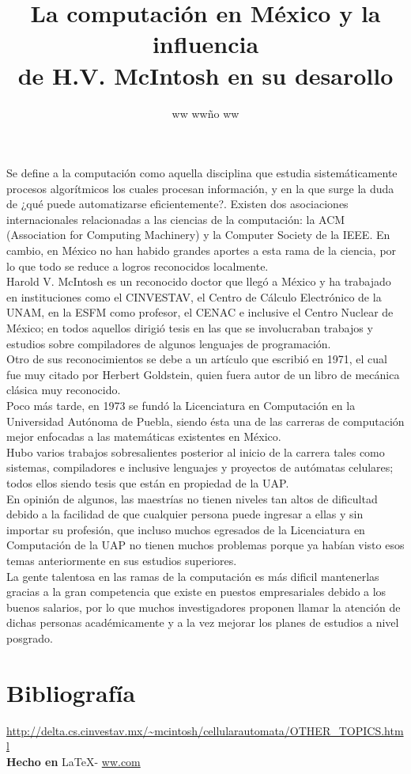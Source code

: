 \documentclass{article}
\title{La computación en México y la influencia \\de H.V. McIntosh en su desarollo}
\author{ww ww\~no ww}
\date{} %
\begin{document}
	\maketitle
	\normalsize{
Se define a la computación como aquella disciplina que estudia sistemáticamente procesos algorítmicos los cuales procesan información, y en la que surge la duda de ¿qué puede automatizarse eficientemente?. Existen dos asociaciones internacionales relacionadas a las ciencias de la computación: la ACM (Association for Computing Machinery) y la Computer Society de la IEEE. En cambio, en México no han habido grandes aportes a esta rama de la ciencia, por lo que todo se reduce a logros reconocidos localmente.
\\

Harold V. McIntosh es un reconocido doctor que llegó a México y ha trabajado en instituciones como el CINVESTAV, el Centro de Cálculo Electrónico de la UNAM, en la ESFM como profesor, el CENAC e inclusive el Centro Nuclear de México; en todos aquellos dirigió tesis en las que se involucraban trabajos y estudios sobre compiladores de algunos lenguajes de programación.
\\

Otro de sus reconocimientos se debe a un artículo que escribió en 1971, el cual fue muy citado por Herbert Goldstein, quien fuera autor de un libro de mecánica clásica muy reconocido.
\\

Poco más tarde, en 1973 se fundó la Licenciatura en Computación en la Universidad Autónoma de Puebla, siendo ésta una de las carreras de computación mejor enfocadas a las matemáticas existentes en México.
\\

Hubo varios trabajos sobresalientes posterior al inicio de la carrera tales como sistemas, compiladores e inclusive lenguajes y proyectos de autómatas celulares; todos ellos siendo tesis que están en propiedad de la UAP.
\\

En opinión de algunos, las maestrías no tienen niveles tan altos de dificultad debido a la facilidad de que cualquier persona puede ingresar a ellas y sin importar su profesión, que incluso muchos egresados de la Licenciatura en Computación de la UAP no tienen muchos problemas porque ya habían visto esos temas anteriormente en sus estudios superiores.
\\

La gente talentosa en las ramas de la computación es más dificil mantenerlas gracias a la gran competencia que existe en puestos empresariales debido a los buenos salarios, por lo que muchos investigadores proponen llamar la atención de dichas personas académicamente y a la vez mejorar los planes de estudios a nivel posgrado.
}

\vspace{2cm}

\section*{Bibliograf\'ia}

\noindent \url{http://delta.cs.cinvestav.mx/~mcintosh/cellularautomata/OTHER_TOPICS.html}
\\

\large{\hfill \textbf{Hecho en } \LaTeX - \url{ww.com}}
\end{document}
